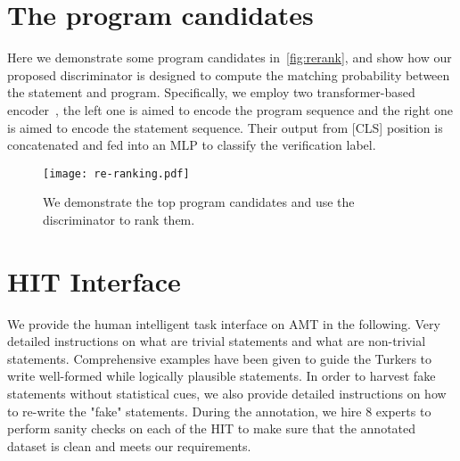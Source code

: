 \documentclass{article} \usepackage{iclr2020_conference,times}
\begin{document}
\section{The program candidates}
\label{app-apis}
Here we demonstrate some program candidates in~\autoref{fig:rerank}, and show how our proposed discriminator is designed to compute the matching probability between the statement and program. Specifically, we employ two transformer-based encoder~\cite{vaswani2017attention}, the left one is aimed to encode the program sequence and the right one is aimed to encode the statement sequence. Their output from [CLS] position is concatenated and fed into an MLP to classify the verification label. 
\begin{figure}[!h]
    \centering
    \texttt{[image: re-ranking.pdf]}
    \caption{We demonstrate the top program candidates and use the discriminator to rank them.}
    \label{fig:rerank}
\end{figure}

\section{HIT Interface}
We provide the human intelligent task interface on AMT in the following. Very detailed instructions on what are trivial statements and what are non-trivial statements. Comprehensive examples have been given to guide the Turkers to write well-formed while logically plausible statements. In order to harvest fake statements without statistical cues, we also provide detailed instructions on how to re-write the "fake" statements. During the annotation, we hire 8 experts to perform sanity checks on each of the HIT to make sure that the annotated dataset is clean and meets our requirements. 
\clearpage


\end{document}
